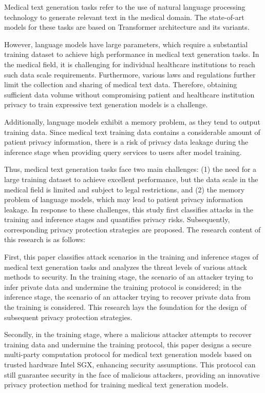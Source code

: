 \begin{abstract*}
  Medical text generation tasks refer to the use of natural language processing technology to generate relevant text in the medical domain. The state-of-art models for these tasks are based on Transformer architecture and its variants.
  
  However, language models have large parameters, which require a substantial training dataset to achieve high performance in medical text generation tasks. In the medical field, it is challenging for individual healthcare institutions to reach such data scale requirements. Furthermore, various laws and regulations further limit the collection and sharing of medical text data. Therefore, obtaining sufficient data volume without compromising patient and healthcare institution privacy to train expressive text generation models is a challenge.
  
  Additionally, language models exhibit a memory problem, as they tend to output training data. Since medical text training data contains a considerable amount of patient privacy information, there is a risk of privacy data leakage during the inference stage when providing query services to users after model training.
  
  Thus, medical text generation tasks face two main challenges: (1) the need for a large training dataset to achieve excellent performance, but the data scale in the medical field is limited and subject to legal restrictions, and (2) the memory problem of language models, which may lead to patient privacy information leakage. In response to these challenges, this study first classifies attacks in the training and inference stages and quantifies privacy risks. Subsequently, corresponding privacy protection strategies are proposed. The research content of this research is as follows:
  
  First, this paper classifies attack scenarios in the training and inference stages of medical text generation tasks and analyzes the threat levels of various attack methods to security. In the training stage, the scenario of an attacker trying to infer private data and undermine the training protocol is considered; in the inference stage, the scenario of an attacker trying to recover private data from the training is considered. This research lays the foundation for the design of subsequent privacy protection strategies.
  
  Secondly, in the training stage, where a malicious attacker attempts to recover training data and undermine the training protocol, this paper designs a secure multi-party computation protocol for medical text generation models based on trusted hardware Intel SGX, enhancing security assumptions. This protocol can still guarantee security in the face of malicious attackers, providing an innovative privacy protection method for training medical text generation models.
  

\end{abstract*}
